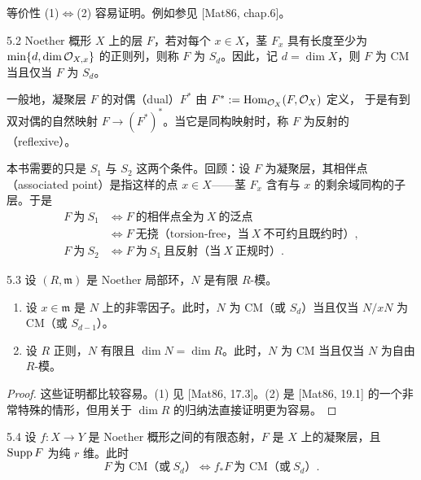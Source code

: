等价性 (1)$\Leftrightarrow$(2) 容易证明。例如参见 [Mat86, chap.6]。

\begin{definition}{5.2}
Noether 概形 $X$ 上的层 $F$，若对每个 $x\in X$，茎 $F_x$ 具有长度至少为 $\min\{d,\dim\mathcal{O}_{X,x}\}$ 的正则列，则称 $F$ 为 $S_d$。因此，记 $d=\dim X$，则 $F$ 为 CM 当且仅当 $F$ 为 $S_d$。

一般地，凝聚层 $F$ 的对偶（dual）$F^*$ 由 $F^*:=\operatorname{Hom}_{\mathcal{O}_X}(F,\mathcal{O}_X)$ 定义，
于是有到双对偶的自然映射 $F\to(F^*)^*$。当它是同构映射时，称 $F$ 为反射的（reflexive）。

本书需要的只是 $S_1$ 与 $S_2$ 这两个条件。回顾：设 $F$ 为凝聚层，其相伴点（associated point）是指这样的点 $x\in X$——茎 $F_x$ 含有与 $x$ 的剩余域同构的子层。于是
\[
\begin{aligned}
F\ \text{为}\ S_1 &\iff F\ \text{的相伴点全为}\ X\ \text{的泛点}\\
&\iff F\ \text{无挠（torsion-free，当}\ X\ \text{不可约且既约时）},\\
F\ \text{为}\ S_2 &\iff F\ \text{为}\ S_1\ \text{且反射（当}\ X\ \text{正规时）}.
\end{aligned}
\]
\end{definition}


\begin{propositionp}{5.3}
设 $(R,\mathfrak{m})$ 是 Noether 局部环，$N$ 是有限 $R$-模。
\begin{enumerate}[label=(\arabic*),leftmargin=*]
\item 设 $x\in\mathfrak{m}$ 是 $N$ 上的非零因子。此时，$N$ 为 CM（或 $S_d$）当且仅当 $N/xN$ 为 CM（或 $S_{d-1}$）。
\item 设 $R$ 正则，$N$ 有限且 $\dim N=\dim R$。此时，$N$ 为 CM 当且仅当 $N$ 为自由 $R$-模。
\end{enumerate}
\end{propositionp}

\begin{proof}
这些证明都比较容易。(1) 见 [Mat86, 17.3]。(2) 是 [Mat86, 19.1] 的一个非常特殊的情形，但用关于 $\dim R$ 的归纳法直接证明更为容易。
\end{proof}

\begin{propositionp}{5.4}
设 $f\colon X\to Y$ 是 Noether 概形之间的有限态射，$F$ 是 $X$ 上的凝聚层，且 $\operatorname{Supp} F$ 为纯 $r$ 维。此时
\[
F\ \text{为 CM（或}\ S_d\text{）}\iff f_*F\ \text{为 CM（或}\ S_d\text{）}.
\]
\end{propositionp}

